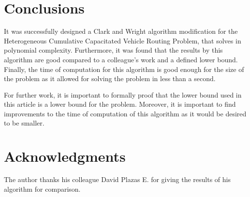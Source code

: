 \documentclass[10pt,twoside]{article}
\begin{document}
\section{Conclusions}\label{sec_conclusions}
It was successfully designed a Clark and Wright algorithm modification
for the Heterogeneous Cumulative Capacitated Vehicle Routing Problem,
that solves in polynomial complexity. Furthermore, it was found that
the results by this algorithm are good compared to a colleague's work
and a defined lower bound. Finally, the time of computation for this
algorithm is good enough for the size of the problem as it allowed for
solving the problem in less than a second.

For further work, it is important to formally proof that the lower
bound used in this article is a lower bound for the problem. Moreover,
it is important to find improvements to the time of computation of
this algorithm as it would be desired to be smaller.
\section*{Acknowledgments}
The author thanks his colleague David Plazas E. for giving the results
of his algorithm for comparison.


{\small


}
\end{document}
